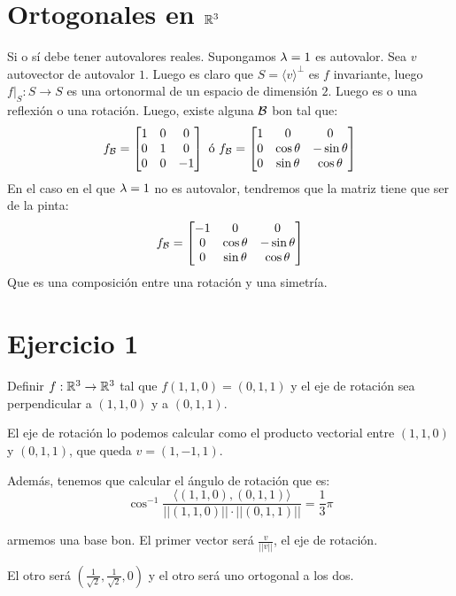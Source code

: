 \documentclass{article}
\begin{document}
\section*{Ortogonales en $\mathbb{R}^3$}
Si o sí debe tener autovalores reales. Supongamos $\lambda = 1$ es autovalor. Sea $v$ autovector de autovalor $1$. Luego es claro que $S = \langle v \rangle^\perp$ es $f$ invariante, luego $f|_S : S \to S$ es una ortonormal de un espacio de dimensión $2$. Luego es o una reflexión o una rotación.
Luego, existe alguna $\mathcal{B}$ bon tal que:
\[
    f_{\mathcal{B}} =
    \begin{bmatrix}
        1 & 0 & 0 \\
        0 & 1 & 0 \\
        0 & 0 & -1 \\
    \end{bmatrix} \text{ ó }
    f_{\mathcal{B}} =
\begin{bmatrix}
    1 & 0 & 0 \\
    0 & \cos \theta & -\sin \theta \\
    0 & \sin \theta & \cos \theta \\
\end{bmatrix}
\]
En el caso en el que $\lambda = 1$ no es autovalor, tendremos que la matriz tiene que ser de la pinta:
\[
    f_{\mathcal{B}} =
\begin{bmatrix}
    -1 & 0 & 0 \\
    0 & \cos \theta & -\sin \theta \\
    0 & \sin \theta & \cos \theta \\
\end{bmatrix}
\]
Que es una composición entre una rotación y una simetría.

\section*{Ejercicio 1}
Definir $f : \mathbb{R}^3 \to \mathbb{R}^3$ tal que $f(1,1,0) = (0,1,1)$ y el eje de rotación sea perpendicular a $(1,1,0)$ y a $(0,1,1)$.

El eje de rotación lo podemos calcular como el producto vectorial entre $(1,1,0)$ y $(0,1,1)$, que queda $v = (1,-1,1)$.

Además, tenemos que calcular el ángulo de rotación que es:
\[
    \cos^{-1} \frac{\langle (1,1,0), (0,1,1) \rangle}{||(1,1,0)|| \cdot ||(0,1,1)||} = \frac{1}{3}\pi
\]

armemos una base bon. El primer vector será $\frac{v}{||v||}$, el eje de rotación.

El otro será $\left(\frac{1}{\sqrt{2}}, \frac{1}{\sqrt{2}}, 0\right)$ y el otro será uno ortogonal a los dos.
\end{document}
